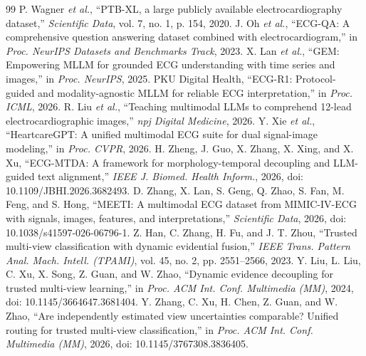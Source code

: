 \documentclass[preprint,12pt]{elsarticle}
\begin{document}
\begin{thebibliography}{99}
 P. Wagner \emph{et al.}, ``PTB-XL, a large publicly available electrocardiography dataset,'' \emph{Scientific Data}, vol. 7, no. 1, p. 154, 2020.
 J. Oh \emph{et al.}, ``ECG-QA: A comprehensive question answering dataset combined with electrocardiogram,'' in \emph{Proc. NeurIPS Datasets and Benchmarks Track}, 2023.
 X. Lan \emph{et al.}, ``GEM: Empowering MLLM for grounded ECG understanding with time series and images,'' in \emph{Proc. NeurIPS}, 2025.
 PKU Digital Health, ``ECG-R1: Protocol-guided and modality-agnostic MLLM for reliable ECG interpretation,'' in \emph{Proc. ICML}, 2026.
 R. Liu \emph{et al.}, ``Teaching multimodal LLMs to comprehend 12-lead electrocardiographic images,'' \emph{npj Digital Medicine}, 2026.
 Y. Xie \emph{et al.}, ``HeartcareGPT: A unified multimodal ECG suite for dual signal-image modeling,'' in \emph{Proc. CVPR}, 2026.
 H. Zheng, J. Guo, X. Zhang, X. Xing, and X. Xu, ``ECG-MTDA: A framework for morphology-temporal decoupling and LLM-guided text alignment,'' \emph{IEEE J. Biomed. Health Inform.}, 2026, doi: 10.1109/JBHI.2026.3682493.
 D. Zhang, X. Lan, S. Geng, Q. Zhao, S. Fan, M. Feng, and S. Hong, ``MEETI: A multimodal ECG dataset from MIMIC-IV-ECG with signals, images, features, and interpretations,'' \emph{Scientific Data}, 2026, doi: 10.1038/s41597-026-06796-1.
 Z. Han, C. Zhang, H. Fu, and J. T. Zhou, ``Trusted multi-view classification with dynamic evidential fusion,'' \emph{IEEE Trans. Pattern Anal. Mach. Intell. (TPAMI)}, vol. 45, no. 2, pp. 2551--2566, 2023.
 Y. Liu, L. Liu, C. Xu, X. Song, Z. Guan, and W. Zhao, ``Dynamic evidence decoupling for trusted multi-view learning,'' in \emph{Proc. ACM Int. Conf. Multimedia (MM)}, 2024, doi: 10.1145/3664647.3681404.
 Y. Zhang, C. Xu, H. Chen, Z. Guan, and W. Zhao, ``Are independently estimated view uncertainties comparable? Unified routing for trusted multi-view classification,'' in \emph{Proc. ACM Int. Conf. Multimedia (MM)}, 2026, doi: 10.1145/3767308.3836405.
\end{thebibliography}
\end{document}
